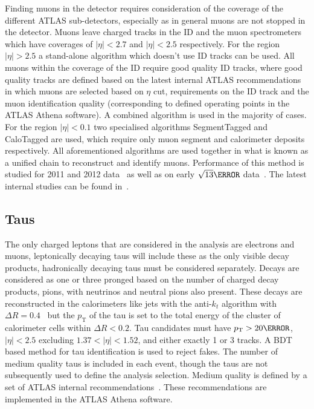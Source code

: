 Finding muons in the detector requires consideration of the coverage of the
different ATLAS sub-detectors, especially as in general muons are not stopped in
the detector. Muons leave charged tracks in the ID and the muon spectrometers
which have coverages of $\lvert \eta \rvert < 2.7$ and $\lvert \eta \rvert <
2.5$ respectively. For the region $\lvert \eta \rvert > 2.5$ a stand-alone
algorithm which doesn't use ID tracks can be used. All muons within the coverage
of the ID require good quality ID tracks, where good quality tracks are defined
based on the latest internal ATLAS recommendations~\cite{muonTWiki,
  MuonSelectionToolTwiki} in which muons are selected based on $\eta$ cut,
requirements on the ID track and the muon identification quality (corresponding
to defined operating points in the ATLAS Athena software). A combined
algorithm is used in the majority of cases. For the region $\lvert \eta  \rvert
< 0.1$ two specialised algorithms SegmentTagged and CaloTagged are used, which
require only muon segment and calorimeter deposits respectively. All
aforementioned algorithms are used together in what is known as a unified
chain to reconstruct and identify muons. Performance of this method is studied
for 2011 and 2012 data~\cite{Aad:2014rra} as well as on early $\sqrt{13} \TeV$
data~\cite{ATL-PHYS-PUB-2015-037}. The latest internal studies can be found
in~\cite{MuonChainTWiki}.

\subsection{Taus}

The only charged leptons that are considered in the analysis are electrons and
muons, leptonically decaying taus will include these as the only visible decay
products, hadronically decaying taus must be considered separately. Decays are
considered as one or three pronged based on the number of charged decay
products, pions, with neutrinos and neutral pions also present. These decays are
reconstructed in the calorimeters like jets with the anti-$k_t$ algorithm with
$\Delta R = 0.4$~\cite{ATL-PHYS-PUB-2015-045} but the $p_{\mathrm{T}}$ of the
tau is set to the total energy of the cluster of calorimeter cells within
$\Delta R < 0.2$. Tau candidates must have $p_{\mathrm{T}} > 20 \GeV$, $\lvert
\eta \rvert < 2.5$ excluding $1.37 < \lvert \eta \rvert < 1.52$, and either
exactly 1 or 3 tracks. A BDT based method for tau identification is used to
reject fakes. The number of medium quality taus is included in each
event, though the taus are not subsequently used to define the analysis
selection. Medium quality is defined by a set of ATLAS internal
recommendations~\cite{TauRecommendation2015,TauRecommendation2016}. These
recommendations are implemented in the ATLAS Athena software.

